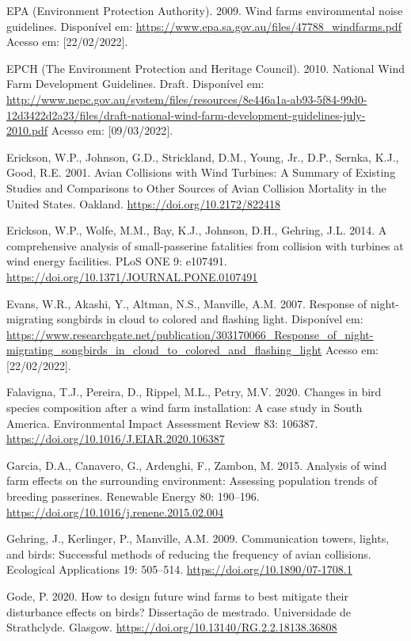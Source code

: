 \documentclass[
  oneside]{scrbook}
\begin{document}
EPA (Environment Protection Authority). 2009. Wind farms environmental noise guidelines. Disponível em: \url{https://www.epa.sa.gov.au/files/47788_windfarms.pdf} Acesso em: {[}22/02/2022{]}.

EPCH (The Environment Protection and Heritage Council). 2010. National Wind Farm Development Guidelines. Draft. Disponível em: \url{http://www.nepc.gov.au/system/files/resources/8e446a1a-ab93-5f84-99d0-12d3422d2a23/files/draft-national-wind-farm-development-guidelines-july-2010.pdf} Acesso em: {[}09/03/2022{]}.

Erickson, W.P., Johnson, G.D., Strickland, D.M., Young, Jr., D.P., Sernka, K.J., Good, R.E. 2001. Avian Collisions with Wind Turbines: A Summary of Existing Studies and Comparisons to Other Sources of Avian Collision Mortality in the United States. Oakland. \url{https://doi.org/10.2172/822418}

Erickson, W.P., Wolfe, M.M., Bay, K.J., Johnson, D.H., Gehring, J.L. 2014. A comprehensive analysis of small-passerine fatalities from collision with turbines at wind energy facilities. PLoS ONE 9: e107491. \url{https://doi.org/10.1371/JOURNAL.PONE.0107491}

Evans, W.R., Akashi, Y., Altman, N.S., Manville, A.M. 2007. Response of night-migrating songbirds in cloud to colored and flashing light. Disponível em: \url{https://www.researchgate.net/publication/303170066_Response_of_night-migrating_songbirds_in_cloud_to_colored_and_flashing_light} Acesso em: {[}22/02/2022{]}.

Falavigna, T.J., Pereira, D., Rippel, M.L., Petry, M.V. 2020. Changes in bird species composition after a wind farm installation: A case study in South America. Environmental Impact Assessment Review 83: 106387. \url{https://doi.org/10.1016/J.EIAR.2020.106387}

Garcia, D.A., Canavero, G., Ardenghi, F., Zambon, M. 2015. Analysis of wind farm effects on the surrounding environment: Assessing population trends of breeding passerines. Renewable Energy 80: 190--196. \url{https://doi.org/10.1016/j.renene.2015.02.004}

Gehring, J., Kerlinger, P., Manville, A.M. 2009. Communication towers, lights, and birds: Successful methods of reducing the frequency of avian collisions. Ecological Applications 19: 505--514. \url{https://doi.org/10.1890/07-1708.1}

Gode, P. 2020. How to design future wind farms to best mitigate their disturbance effects on birds? Dissertação de mestrado. Universidade de Strathclyde. Glasgow. \url{https://doi.org/10.13140/RG.2.2.18138.36808}
\end{document}
